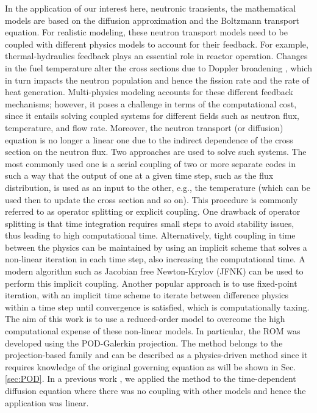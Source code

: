 \documentclass[]{interact}
\theoremstyle{plain}%
\theoremstyle{definition}
\theoremstyle{remark}
\begin{document}
In the application of our interest here, neutronic transients, the mathematical models are based on the diffusion approximation and the Boltzmann transport equation.
For realistic modeling, these neutron transport models need to be coupled with different physics models to account for their feedback.
For example, thermal-hydraulics feedback plays an essential role in reactor operation.
Changes in the fuel temperature alter the cross sections due to Doppler broadening \cite{stacey2018nuclear}, which in turn impacts the neutron population and hence the fission rate and the rate of heat generation.
Multi-physics modeling accounts for these different feedback mechanisms; however, it poses a challenge in terms of the computational cost,
since it entails solving coupled systems for different fields such as neutron flux, temperature, and flow rate.
Moreover, the neutron transport (or diffusion) equation is no longer a linear one due to the indirect dependence of the cross section on the neutron flux.
Two approaches are used to solve such systems.
The most commonly used one is a serial coupling of two or more separate codes in such a way that the output of one at a given time step, such as the flux distribution, is used as an input to the other, e.g., the temperature (which can be used then to update the cross section and so on).
This procedure is commonly referred to as operator splitting or explicit coupling.
One drawback of operator splitting is that time integration requires small steps to avoid stability issues, thus leading to high computational time. 
Alternatively, tight coupling in time between the physics can be maintained by using an implicit scheme that solves a non-linear iteration in each time step, also increasing the computational time.
A modern algorithm such as Jacobian free Newton-Krylov (JFNK) \cite{gaston2009parallel} can be used to perform this implicit coupling.
Another popular approach is to use fixed-point iteration, with an implicit time scheme to iterate between difference physics within a time step until convergence is satisfied, which is computationally taxing.
The aim of this work is to use a reduced-order model to overcome the high computational expense of these non-linear models.
In particular, the ROM was developed using the POD-Galerkin projection.
The method belongs to the projection-based family and can be described as a physics-driven method since it requires knowledge of the original governing equation as will be shown in Sec.\ref{sec:POD}.
In a previous work \cite{elzohery2021modeling}, we applied the method to the time-dependent diffusion equation where there was no coupling with other models and hence the application was linear.
\end{document}

